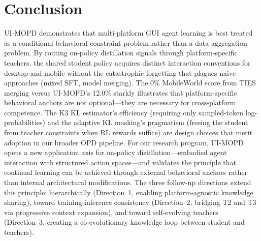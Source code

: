 \documentclass[11pt,a4paper]{article}
\begin{document}
\section{Conclusion}

UI-MOPD demonstrates that multi-platform GUI agent learning is best treated as a conditional behavioral constraint problem rather than a data aggregation problem. By routing on-policy distillation signals through platform-specific teachers, the shared student policy acquires distinct interaction conventions for desktop and mobile without the catastrophic forgetting that plagues naive approaches (mixed SFT, model merging). The 0\% MobileWorld score from TIES merging versus UI-MOPD's 12.0\% starkly illustrates that platform-specific behavioral anchors are not optional---they are necessary for cross-platform competence. The K3 KL estimator's efficiency (requiring only sampled-token log-probabilities) and the adaptive KL masking's pragmatism (freeing the student from teacher constraints when RL rewards suffice) are design choices that merit adoption in our broader OPD pipeline. For our research program, UI-MOPD opens a new application axis for on-policy distillation---embodied agent interaction with structured action spaces---and validates the principle that continual learning can be achieved through external behavioral anchors rather than internal architectural modifications. The three follow-up directions extend this principle: hierarchically (Direction~1, enabling platform-agnostic knowledge sharing), toward training-inference consistency (Direction~2, bridging T2 and T3 via progressive context expansion), and toward self-evolving teachers (Direction~3, creating a co-evolutionary knowledge loop between student and teachers).
\end{document}
